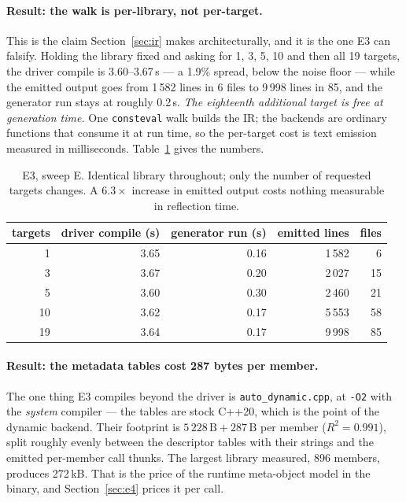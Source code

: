 \documentclass[11pt,a4paper]{article}
\newcommand{\code}[1]{\texttt{\small #1}}
\begin{document}
\paragraph{Result: the walk is per-library, not per-target.} This is the claim
Section~\ref{sec:ir} makes architecturally, and it is the one E3 can falsify.
Holding the library fixed and asking for 1, 3, 5, 10 and then all 19 targets,
the driver compile is 3.60--3.67\,s --- a 1.9\% spread, below the noise floor
--- while the emitted output goes from 1\,582 lines in 6 files to 9\,998 lines
in 85, and the generator run stays at roughly 0.2\,s. \emph{The eighteenth
additional target is free at generation time.} One \code{consteval} walk builds
the IR; the backends are ordinary functions that consume it at run time, so the
per-target cost is text emission measured in milliseconds. Table~\ref{tab:e3}
gives the numbers.

\begin{table}[h]
\centering\small
\begin{tabular}{rrrrr}
\toprule
targets & driver compile (s) & generator run (s) & emitted lines & files \\
\midrule
1  & 3.65 & 0.16 & 1\,582 & 6 \\
3  & 3.67 & 0.20 & 2\,027 & 15 \\
5  & 3.60 & 0.30 & 2\,460 & 21 \\
10 & 3.62 & 0.17 & 5\,553 & 58 \\
19 & 3.64 & 0.17 & 9\,998 & 85 \\
\bottomrule
\end{tabular}
\caption{E3, sweep E. Identical library throughout; only the number of requested
targets changes. A $6.3\times$ increase in emitted output costs nothing
measurable in reflection time.}
\label{tab:e3}
\end{table}

\paragraph{Result: the metadata tables cost 287 bytes per member.} The one thing
E3 compiles beyond the driver is \code{auto\_dynamic.cpp}, at \code{-O2} with the
\emph{system} compiler --- the tables are stock C++20, which is the point of the
dynamic backend. Their footprint is $5\,228\,\text{B} + 287\,\text{B}$ per member
($R^2 = 0.991$), split roughly evenly between the descriptor tables with their
strings and the emitted per-member call thunks. The largest library measured,
896 members, produces 272\,kB. That is the price of the runtime meta-object
model in the binary, and Section~\ref{sec:e4} prices it per call.
\end{document}
